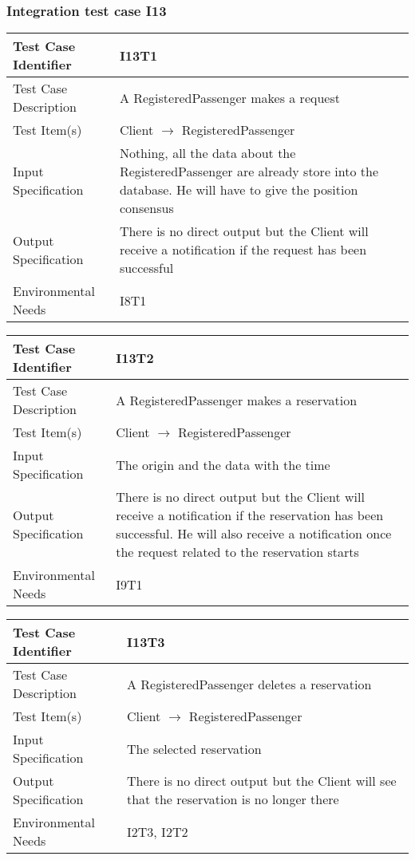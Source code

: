 		\subsubsection{Integration test case I13}
		\begin{center}
			\begin{tabular}{ |l p{10cm}| } \hline
				Test Case Identifier & I13T1 \\ \hline
				Test Case Description & A RegisteredPassenger makes a request \\ \hline
				Test Item(s) & Client $\rightarrow$ RegisteredPassenger \\ \hline
				Input Specification & Nothing, all the data about the RegisteredPassenger are already store into the database. He will have to give the position consensus\\ \hline
				Output Specification & There is no direct output but the Client will receive a notification if the request has been successful \\ \hline
				Environmental Needs & I8T1 \\ \hline
			\end{tabular}
		\end{center}
		\vspace{1cm}
		\begin{center}
			\begin{tabular}{ |l p{10cm}| } \hline
				Test Case Identifier & I13T2 \\ \hline
				Test Case Description & A RegisteredPassenger makes a reservation \\ \hline
				Test Item(s) & Client $\rightarrow$ RegisteredPassenger \\ \hline
				Input Specification & The origin and the data with the time \\ \hline
				Output Specification & There is no direct output but the Client will receive a notification if the reservation has been successful.
				He will also receive a notification once the request related to the reservation starts \\ \hline
				Environmental Needs & I9T1 \\ \hline
			\end{tabular}
		\end{center}
		\vspace{1cm}
		\begin{center}
			\begin{tabular}{ |l p{10cm}| } \hline
				Test Case Identifier & I13T3 \\ \hline
				Test Case Description & A RegisteredPassenger deletes a reservation \\ \hline
				Test Item(s) & Client $\rightarrow$ RegisteredPassenger \\ \hline
				Input Specification & The selected reservation \\ \hline
				Output Specification & There is no direct output but the Client will see that the reservation is no longer there \\ \hline
				Environmental Needs & I2T3, I2T2 \\ \hline
			\end{tabular}
		\end{center}
